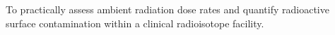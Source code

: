 To practically assess ambient radiation dose rates and quantify radioactive surface contamination within a clinical radioisotope facility.